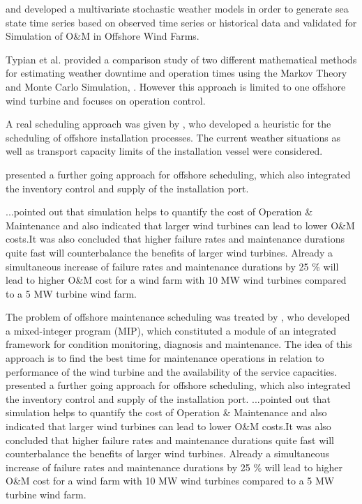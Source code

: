 \cite{Hagen2013} and \cite{scheu2012} developed  a multivariate stochastic weather models in order to generate sea state time series based on observed time series or historical data and validated for Simulation of O\&M in Offshore Wind Farms. 


Typian et al. provided a comparison study of two different mathematical methods for estimating weather downtime and operation times using the Markov Theory and Monte Carlo Simulation, \cite{Tyapin2011}. However this approach is limited to one offshore wind turbine and focuses on operation control.




A real scheduling approach was given by \cite{Scholz2010}, who developed a heuristic for the scheduling of offshore installation processes. The current weather situations as well as transport capacity limits of the installation vessel were considered.



\cite{ISOPE2012} presented a further going approach for offshore scheduling, which also integrated the inventory control and supply of the installation port.




\cite{Hofmann2014} ...pointed out that simulation helps to quantify the cost of Operation \& Maintenance  and also indicated that larger wind turbines can lead to lower O\&M costs.It was also concluded that higher failure rates and maintenance durations quite fast will counterbalance the benefits of larger wind turbines. Already a simultaneous increase of failure rates and maintenance durations by 25 \% will lead to higher O\&M cost for a wind farm with 10 MW wind turbines compared to a 5 MW turbine wind farm. 



The problem of offshore maintenance scheduling was treated by \cite{Kovacs2011497}, who developed a mixed-integer program (MIP), which constituted a module of an integrated framework for condition monitoring, diagnosis and maintenance. The idea of this approach is to find the best time for maintenance operations in relation to performance of the wind turbine and the availability of
the service capacities.
\cite{ISOPE2012} presented a further going approach for offshore scheduling, which also integrated the inventory control and supply 
of the installation port.
\cite{Hofmann2014} ...pointed out that simulation helps to quantify the cost of Operation \& Maintenance  and also indicated that 
larger wind turbines can lead to lower O\&M costs.It was also concluded that higher failure rates and maintenance durations quite 
fast will counterbalance the benefits of larger wind turbines. Already a simultaneous increase of failure rates and maintenance 
durations by 25 \% will lead to higher O\&M cost for a wind farm with 10 MW wind turbines compared to a 5 MW turbine wind farm. 


